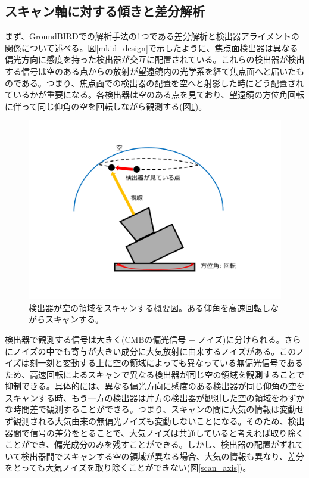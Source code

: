 \subsection{スキャン軸に対する傾きと差分解析}
\label{scan_pair_diff}
まず、GroundBIRDでの解析手法の1つである差分解析と検出器アライメントの関係について述べる。図\ref{mkid_design}で示したように、焦点面検出器は異なる偏光方向に感度を持った検出器が交互に配置されている。これらの検出器が検出する信号は空のある点からの放射が望遠鏡内の光学系を経て焦点面へと届いたものである。つまり、焦点面での検出器の配置を空へと射影した時にどう配置されているかが重要になる。各検出器は空のある点を見ており、望遠鏡の方位角回転に伴って同じ仰角の空を回転しながら観測する(図\ref{scan_image})。
\begin{figure}[htbp]
  \centering
  \includegraphics[width=0.6\columnwidth]{5_alignment/figs/scan_image.pdf}
  \caption{検出器が空の領域をスキャンする概要図。ある仰角を高速回転しながらスキャンする。}
  \label{scan_image}
\end{figure}
検出器で観測する信号は大きく(CMBの偏光信号 + ノイズ)に分けられる。さらにノイズの中でも寄与が大きい成分に大気放射に由来するノイズがある。このノイズは刻一刻と変動する上に空の領域によっても異なっている無偏光信号であるため、高速回転によるスキャンで異なる検出器が同じ空の領域を観測することで抑制できる。具体的には、異なる偏光方向に感度のある検出器が同じ仰角の空をスキャンする時、もう一方の検出器は片方の検出器が観測した空の領域をわずかな時間差で観測することができる。つまり、スキャンの間に大気の情報は変動せず観測される大気由来の無偏光ノイズも変動しないことになる。そのため、検出器間で信号の差分をとることで、大気ノイズは共通していると考えれば取り除くことができ、偏光成分のみを残すことができる。しかし、検出器の配置がずれていて検出器間でスキャンする空の領域が異なる場合、大気の情報も異なり、差分をとっても大気ノイズを取り除くことができない(図\ref{scan_axis})。
